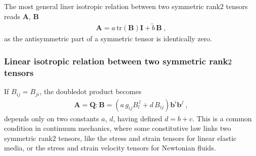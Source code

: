 \documentclass[letterpaper,10pt,english]{jupyterBook}
\begin{document}
\sphinxAtStartPar
The most general liner isotropic relation between two symmetric rank\sphinxhyphen{}\(2\) tensors reads \(\mathbf{A}\), \(\mathbf{B}\)
\begin{equation*}
\begin{split}\mathbf{A} = a \, \text{tr}\left( \mathbf{B} \right) \mathbf{I} + \widetilde{b} \, \mathbf{B} \ ,\end{split}
\end{equation*}
\sphinxAtStartPar
as the anti\sphinxhyphen{}symmetric part of a symmetric tensor is identically zero.
\subsubsection*{Linear isotropic relation between two symmetric rank\sphinxhyphen{}\protect\(2 \ \protect\) tensors}

\sphinxAtStartPar
If \(B_{ij} = B_{ji}\), the double\sphinxhyphen{}dot product becomes
\begin{equation*}
\begin{split}\mathbf{A} = \mathbf{Q} : \mathbf{B} = \left( a \, g_{ij} B_l^{\ l} + d \, B_{ij} \right) \mathbf{b}^i \mathbf{b}^j \ ,\end{split}
\end{equation*}
\sphinxAtStartPar
depends only on two constants \(a\), \(d\), having defined \(d = b + c\). This is a common condition in continuum mechanics, where some constitutive law links two symmetric rank\sphinxhyphen{}\(2\) tensors, like the stress and strain tensors for linear elastic media, or the stress and strain velocity tensors for Newtonian fluids.

\sphinxstepscope
\end{document}
